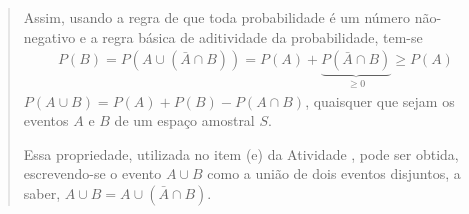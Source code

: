 \begin{quote}
Assim, usando a regra de que toda probabilidade é um número não-negativo e a regra básica de aditividade da probabilidade, tem-se
\begin{equation*}
\begin{split}P(B)=P(A\cup(\bar{A}\cap B))=P(A)+\underbrace{P(\bar{A}\cap B)}_{\geq 0}\geq P(A)\end{split}
\end{equation*}
 \(P(A\cup B)=P(A)+P(B)-P(A\cap B)\), quaisquer que sejam os eventos \(A\) e \(B\) de um espaço amostral \(S\).

Essa propriedade, utilizada no item (e) da Atividade , pode ser obtida, escrevendo-se o evento \(A\cup B\) como a união de dois eventos disjuntos, a saber, \(A\cup B=A\cup (\bar{A}\cap B)\).
\end{quote}

